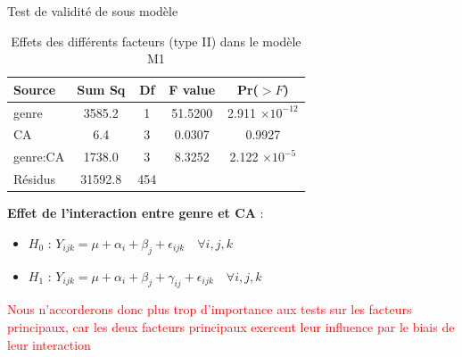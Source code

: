 \documentclass{beamer}
\begin{document}
	\begin{frame}{Test de validité de sous modèle}
		\begin{table}[H]
			\centering
			\caption{Effets des différents facteurs (type II) dans le modèle M1}
			\begin{tabular}{lcccc}
				\toprule
				Source & Sum Sq & Df & F value & Pr($>F$) \\ 
				\midrule
				genre & 3585.2 & 1 & 51.5200 & 2.911 $\times 10^{-12}$ \\ 
				CA & 6.4 & 3 & 0.0307 & 0.9927 \\ 
				genre:CA & 1738.0 & 3 & 8.3252 & 2.122 $\times 10^{-5}$ \\ 
				Résidus & 31592.8 & 454 & & \\ 
				\bottomrule
			\end{tabular}
			\label{tab:anova_results2}
		\end{table}
		
		\textbf{Effet de l'interaction entre genre et CA} :
		\begin{itemize}
			\item \textbf{$H_0$} : $Y_{ijk} = \mu + \alpha_i + \beta_j + \epsilon_{ijk} \quad \forall i,j,k$ 
			\item \textbf{$H_1$} : $Y_{ijk} = \mu + \alpha_i + \beta_j + \gamma_{ij} + \epsilon_{ijk} \quad \forall i,j,k$
		\end{itemize}
		\textcolor{red}{Nous n'accorderons donc plus trop d'importance aux tests sur les facteurs principaux, car les deux facteurs principaux exercent leur influence par le biais de leur interaction}
	\end{frame}
	
\end{document}
